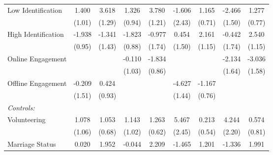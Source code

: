 \begin{table}[htbp]
\begin{tabular}{l*{8}{c}}
\hspace{0.25cm} Low Identification&1.400         &3.618\sym{**} &1.326         &3.780\sym{**} &-1.606         &1.165         &-2.466         &1.277         \\
                              &(1.01)         &(1.29)         &(0.94)         &(1.21)         &(2.43)         &(0.71)         &(1.50)         &(0.77)         \\
\hspace{0.25cm} High Identification&-1.938\sym{^+} &-1.341         &-1.823\sym{*}  &-0.977         &0.454         &2.161\sym{^+} &-0.442         &2.540\sym{*}  \\
                              &(0.95)         &(1.43)         &(0.88)         &(1.74)         &(1.50)         &(1.15)         &(1.74)         &(1.15)         \\
\hspace{0.25cm} Online Engagement&              &              &-0.110         &-1.834\sym{*}  &              &              &-2.134         &-3.036\sym{^+} \\
                              &              &              &(1.03)         &(0.86)         &              &              &(1.64)         &(1.58)         \\
\hspace{0.25cm} Offline Engagement&-0.209         &0.424         &              &              &-4.627\sym{**} &-1.167         &              &              \\
                              &(1.51)         &(0.93)         &              &              &(1.44)         &(0.76)         &              &              \\
\emph{Controls:}              &              &              &              &              &              &              &              &              \\
\hspace{0.25cm} Volunteering  &1.078         &1.053         &1.143         &1.263\sym{^+} &5.467\sym{*}  &0.213         &4.244\sym{^+} &0.574         \\
                              &(1.06)         &(0.68)         &(1.02)         &(0.62)         &(2.45)         &(0.54)         &(2.20)         &(0.81)         \\
\hspace{0.25cm} Marriage Status&0.020         &1.952\sym{^+} &-0.044         &2.209         &-1.465         &1.201\sym{^+} &-1.336         &1.991\sym{^+} \\

\end{tabular}
\end{table}

